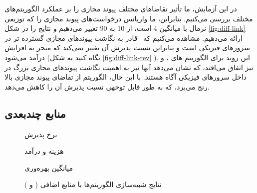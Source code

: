   در این آزمایش‌، ما تأثیر تقاضاهای  مختلف پیوند مجازی را بر عملکرد الگوریتم‌های مختلف بررسی می‌کنیم. بنابراین‌، ما واریانس درخواست‌های پیوند مجازی را که توزیعی نرمال با میانگین 4  است‌، از 10  به 90  تغییر می‌دهیم و نتایج را در شکل \ref{fig:diff-link} ارائه می‌دهیم.
  مشاهده می‌کنیم که \ourAlg\ قادر به نگاشت پیوندهای مجازی گسترده تر در سرورهای فیزیکی است و بنابراین نسبت پذیرش آن تغییر نمی‌کند که منجر به افزایش درآمد می‌شود (نگاه کنید به شکل \ref{fig:diff-link-rev} ). این روند برای الگوریتم های ‌، و  نیز اتفاق می‌افتد‌، که نشان می‌دهد آنها نیز به اهمیت نگاشت پیوندهای مجازی بزرگ در داخل سرورهای فیزیکی آگاه هستند. با این حال‌، الگوریتم  از تقاضای پیوند مجازی بالا رنج می‌برد‌، که به طور قابل توجهی نسبت پذیرش آن را کاهش می‌دهد.
  \subsection{منابع چند‌بعدی}
  
      \begin{figure*}[t]
      	\centering
      	\begin{minipage}{.3\linewidth}
      		\centering
      		\resizebox{\linewidth}{!}{%
      			
      		}%
      		\caption{نرخ پذیرش}
      		\label{fig:ar-load1000-with-gpu}
      	\end{minipage}
      	\hfil
      	\begin{minipage}{.3\linewidth}
      		\centering
      		\resizebox{\linewidth}{!}{%
      			
      		}%
      		\caption{هزینه و درآمد}
      		\label{fig:cost-rev-load1000-with-gpu}
      	\end{minipage}
      	\hfil
      	\begin{minipage}{.3\linewidth}
      		\centering
      		\resizebox{\linewidth}{!}{%
      			
      		}%
      		\caption{میانگین بهره‌وری}
      		\label{fig:avg-util-with-gpu}
      	\end{minipage}
      	\caption{نتایج شبیه‌سازی الگوریتم‌ها با منابع اضافی ( و )}
      	\label{fig:multi_feature}
      \end{figure*}
  
